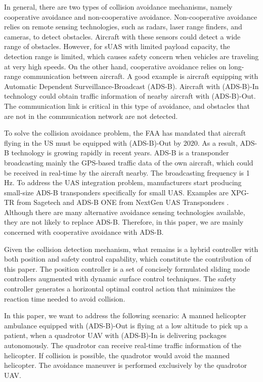 \documentclass[journal,11pt,onecolumn,draftclsnofoot,]{IEEEtran}
\begin{document}
In general, there are two types of collision avoidance mechanisms, namely cooperative avoidance and non-cooperative avoidance. Non-cooperative avoidance relies on remote sensing technologies, such as radars, laser range finders, and cameras, to detect obstacles. Aircraft with these sensors could detect a wide range of obstacles. However, for sUAS with limited payload capacity, the detection range is limited, which causes safety concern when vehicles are traveling at very high speeds. On the other hand, cooperative avoidance relies on long-range communication between aircraft. A good example is aircraft equipping with Automatic Dependent Surveillance-Broadcast (ADS-B). Aircraft with (ADS-B)-In technology could obtain traffic information of nearby aircraft with (ADS-B)-Out. The communication link is critical in this type of avoidance, and obstacles that are not in the communication network are not detected.

To solve the collision avoidance problem, the FAA has mandated that aircraft flying in the US must be equipped with (ADS-B)-Out by 2020. As a result, ADS-B technology is growing rapidly in recent years. ADS-B is a transponder broadcasting mainly the GPS-based traffic data of the own aircraft, which could be received in real-time by the aircraft nearby. The broadcasting frequency is 1 Hz. To address the UAS integration problem, manufacturers start producing small-size ADS-B transponders specifically for small UAS. Examples are XPG-TR from Sagetech \cite{sagetech} and ADS-B ONE from NextGen UAS Transponders \cite{ads-b-one}. Although there are many alternative avoidance sensing technologies available, they are not likely to replace ADS-B. Therefore, in this paper, we are mainly concerned with cooperative avoidance with ADS-B.

Given the collision detection mechanism, what remains is a hybrid controller with both position and safety control capability, which constitute the contribution of this paper. The position controller is a set of concisely formulated sliding mode controllers augmented with dynamic surface control techniques. The safety controller generates a horizontal optimal control action that minimizes the reaction time needed to avoid collision.

In this paper, we want to address the following scenario: A manned helicopter ambulance equipped with (ADS-B)-Out is flying at a low altitude to pick up a patient, when a quadrotor UAV with (ADS-B)-In is delivering packages autonomously. The quadrotor can receive real-time traffic information of the helicopter. If collision is possible, the quadrotor would avoid the manned helicopter. The avoidance maneuver is performed exclusively by the quadrotor UAV.
\end{document}
